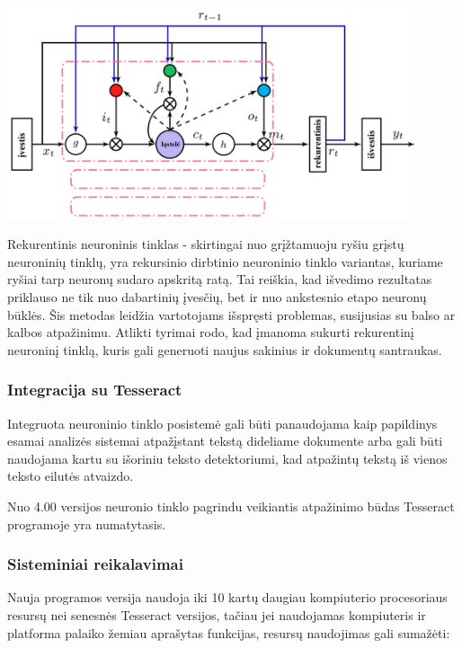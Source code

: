 \documentclass{VUMIFInfBakalaurinis}
\begin{document}
\begin{minipage}{\linewidth}
  \centering
  \includegraphics[width=12cm]{memory_block.png}
  \label{memory_block}
\end{minipage}

Rekurentinis neuroninis tinklas - skirtingai nuo grįžtamuoju ryšiu grįstų neuroninių tinklų, yra rekursinio 
dirbtinio neuroninio tinklo variantas, kuriame ryšiai tarp neuronų sudaro apskritą ratą. Tai reiškia,
kad išvedimo rezultatas priklauso ne tik nuo dabartinių įvesčių, bet ir nuo ankstesnio etapo neuronų būklės. 
Šis metodas leidžia vartotojams išspręsti problemas, susijusias su balso ar kalbos atpažinimu.
Atlikti tyrimai rodo, kad įmanoma sukurti rekurentinį neuroninį tinklą, kuris gali generuoti naujus sakinius ir dokumentų santraukas.

\subsubsection{Integracija su Tesseract}
Integruota neuroninio tinklo posistemė gali būti panaudojama kaip papildinys esamai analizės sistemai atpažįstant tekstą dideliame dokumente arba
gali būti naudojama kartu su išoriniu teksto detektoriumi, kad atpažintų tekstą iš vienos teksto eilutės atvaizdo.

Nuo 4.00 versijos neuronio tinklo pagrindu veikiantis atpažinimo būdas Tesseract programoje yra numatytasis. 

\subsubsection{Sisteminiai reikalavimai}
Nauja programos versija naudoja iki 10 kartų daugiau kompiuterio procesoriaus resursų nei senesnės Tesseract versijos, 
tačiau jei naudojamas kompiuteris ir platforma palaiko žemiau aprašytas funkcijas, resursų naudojimas gali sumažėti:
\end{document}
